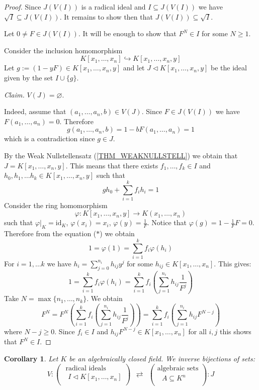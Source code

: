 \documentclass[12pt, letterpaper, oneside]{article}
\theoremstyle{plain}
\newtheorem{corollary}[theorem]{Corollary}
\theoremstyle{definition}
\newcommand{\hra}{\hookrightarrow}
\newcommand{\id}{\mathrm{id}}
\newcommand{\vs}{\vskip 5mm}
\begin{document}
\begin{proof}
Since  $J(V(I))$ is a radical ideal and $I\subseteq J(V(I))$ we have $\sqrt{I}\subseteq J(V(I))$. 
It remains to show then that $J(V(I)) \subseteq \sqrt{I}$.

Let $0\neq F\in J(V(I))$. It will be enough to show that $F^{N} \in I$ for some $N\geq 1$. 

Consider the inclusion homomorphism 
$$K[x_{1}, \dots, x_{n}] \hra K[x_{1}, \dots, x_{n}, y]$$
Let  $g := (1-yF) \in K[x_{1}, \dots, x_{n}, y]$ and let $J\lhd K[x_{1}, \dots, x_{n}, y]$ be the
ideal given by the set $I\cup \{g\}$. 

\emph{Claim.} $V(J) = \varnothing$. 

Indeed, assume that $(a_{1}, \dots, a_{n}, b) \in V(J)$. Since $F\in J(V(I))$ we have 
$F(a_{1}, \dots, a_{n}) = 0$. Therefore 
$$g(a_{1}, \dots, a_{n}, b) = 1- bF(a_{1}, \dots, a_{n}) = 1$$
which is a contradiction since $g\in J$. 


By the Weak Nullstellensatz (\ref{THM_WEAKNULLSTELL}) we obtain that 
$J = K[x_{1}, \dots, x_{n}, y]$. This means that there exists $f_{1}, \dots, f_{k}\in I$ and 
$h_{0}, h_{1}, \dots h_{k}\in K[x_{1}, \dots, x_{n}, y]$ such that 
\begin{equation*}
\tag{$\ast$}
gh_{0} + \sum_{i=1}^{k} f_{i}h_{i}  = 1
\end{equation*}
Consider the ring homomorphism 
$$\varphi\colon K[x_{1}, \dots, x_{n}, y]  \to K(x_{1}, \dots, x_{n})$$
such that  $\varphi|_{K} = \id_{K}$, $\varphi(x_{i}) = x_{i}$, $\varphi(y) = \frac{1}{F}$. 
Notice that $\varphi(g) = 1 - \frac{1}{F} F = 0$. Therefore from the equation ($\ast$) we obtain
$$1 = \varphi(1) =  \sum_{i=1}^{k} f_{i}\varphi(h_{i})$$
For $i=1, \dots k$ we have  $h_{i} = \sum_{j=0}^{n_{i}} h_{ij}y^{j}$ 
for some  $h_{ij} \in K[x_{1}, \dots, x_{n}]$. This gives:
$$1 = \sum_{i=1}^{k} f_{i}\varphi(h_{i}) = 
\sum_{i=1}^{k} f_{i}\left( \sum_{j=1}^{n_{i}} h_{ij}\frac{1}{F^{j}}\right)$$
Take $N = \max\{n_{1}, \dots, n_{k}\}$. We obtain
$$F^{N} = F^{N}\left(  \sum_{i=1}^{k} f_{i}\left( \sum_{j=1}^{n_{i}} h_{ij}\frac{1}{F^{j}}\right)\right) 
=  \sum_{i=1}^{k} f_{i}\left( \sum_{j=1}^{n_{i}} h_{ij}F^{N-j}\right)$$
where $N-j \geq 0$. 
Since $f_{i}\in I$ and $h_{ij}F^{N-j} \in K[x_{1}, \dots, x_{n}]$ for all $i, j$ this shows that 
$F^{N}\in I$. 
\end{proof}



\vs\vs

\begin{corollary}
\label{COR_NULLSTELLCORRESP}
Let $K$ be an algebraically closed field. We inverse bijections of sets:
$$
V\colon
\begin{pmatrix}
\text{ radical ideals} \\[1mm]
\text{  $I\lhd  K[x_{1}, \dots, x_{n}]$} \\
\end{pmatrix}
\ \ \rightleftarrows \ \ 
\begin{pmatrix}
\text{algebraic sets} \\[1mm]
\text{ $A\subseteq K^{n}$} \\
\end{pmatrix} \colon J
$$
\end{corollary}
\end{document}
